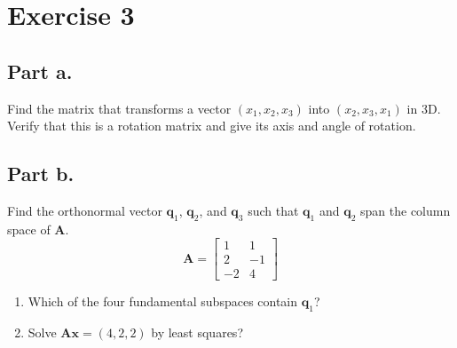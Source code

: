 \section{Exercise 3}
\subsection{Part a.}
Find the matrix that transforms a vector $(x_{1}, x_{2}, x_{3})$ into 
$(x_{2}, x_{3}, x_{1})$ in 3D. Verify that this is a rotation matrix and
give its axis and angle of rotation.
\subsection{Part b.}
Find the orthonormal vector $\mathbf{q}_{1}$, $\mathbf{q}_{2}$, and 
$\mathbf{q}_{3}$ such that $\mathbf{q}_{1}$ and $\mathbf{q}_{2}$ span the
column space of $\mathbf{A}$.
\begin{equation}
    \mathbf{A} =
    \begin{bmatrix}
        1       &       1       \\
        2       &       -1      \\
        -2      &       4       
    \end{bmatrix}
\end{equation}
\begin{enumerate}[label=(\arabic*)]
    \item Which of the four fundamental subspaces contain $\mathbf{q}_{1}$?
    \item Solve $\mathbf{A}\mathbf{x} = (4,2,2)$ by least squares?
\end{enumerate}
